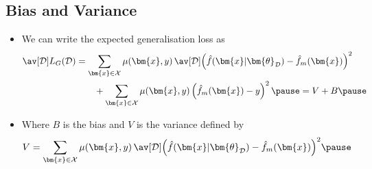 \begin{slide}
\section[-2]{Bias and Variance}

\begin{PauseHighLight}
  \begin{itemize}
  \item We can write the expected generalisation loss as
    \begin{align*}
      \av[\mathcal{D}]{ L_G(\mathcal{D}) }
      &= \sum_{\bm{x}\in\mathcal{X}} \mu(\bm{x},y)\, 
      \av[\mathcal{D}]{ \left(\hat{f}(\bm{x}\vert \bm{\theta}_{\mathcal{D}}) -
      \hat{f}_m(\bm{x})\right)^2 } \\
        & \quad \quad +
          \sum_{\bm{x}\in\mathcal{X}} \mu(\bm{x},y) \left( \hat{f}_m(\bm{x})
      - y \right)^2 \pause
        = V + B\pause
    \end{align*}
  \item Where $B$ is the bias and $V$ is the variance defined by
    \begin{align*}
      V = \sum_{\bm{x}\in\mathcal{X}} \mu(\bm{x},y)\,
      \av[\mathcal{D}]{ \left(\hat{f}(\bm{x}\vert \bm{\theta}_{\mathcal{D}}) -
      \hat{f}_m(\bm{x})\right)^2 }\pause 
    \end{align*}
  \end{itemize}
\end{PauseHighLight}

\end{slide}


